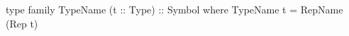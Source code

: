 \begin{code}
type family TypeName (t :: Type) :: Symbol where
  TypeName t = RepName (Rep t)
\end{code}
